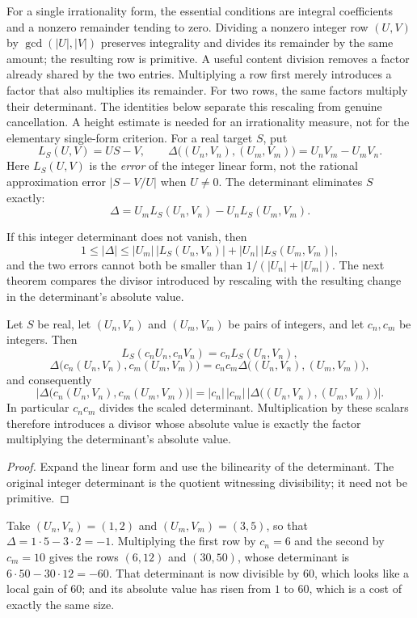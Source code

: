 For a single irrationality form, the essential conditions are
integral coefficients and a nonzero remainder tending to zero.
Dividing a nonzero integer row $(U,V)$ by $\gcd(|U|,|V|)$
preserves integrality and divides its remainder by the same amount;
the resulting row is primitive. A useful content division removes a factor already shared by the
two entries. Multiplying a row first merely introduces a factor
that also multiplies its remainder. For two rows, the same factors
multiply their determinant. The identities below separate this
rescaling from genuine cancellation. A height estimate is needed
for an irrationality measure, not for the elementary single-form
criterion. For a real target $S$, put
\[
 L_S(U,V)=US-V,
 \qquad
 \Delta\bigl((U_n,V_n),(U_m,V_m)\bigr)=U_nV_m-U_mV_n.
\]
Here \(L_S(U,V)\) is the \emph{error} of the integer linear form,
not the rational approximation error $|S-V/U|$ when $U\ne0$.
The determinant eliminates \(S\) exactly:
\[
\Delta=U_mL_S(U_n,V_n)-U_nL_S(U_m,V_m).
\]

If this integer determinant does not vanish, then
\[
 1\le|\Delta|
  \le|U_m|\,\bigl|L_S(U_n,V_n)\bigr|+|U_n|\,\bigl|L_S(U_m,V_m)\bigr|,
\]
and the two errors cannot both be smaller than
\(1/(|U_n|+|U_m|)\).  The next theorem compares the divisor introduced by rescaling with
the resulting change in the determinant's absolute value.

\begin{theorem}\label{long1049:res:content}
Let \(S\) be real, let \((U_n,V_n)\) and \((U_m,V_m)\) be pairs of integers, and
let \(c_n,c_m\) be integers.  Then
\[
 L_S(c_nU_n,c_nV_n)=c_nL_S(U_n,V_n),
\]
\[
 \Delta\bigl(c_n(U_n,V_n),c_m(U_m,V_m)\bigr)
 =c_nc_m\Delta\bigl((U_n,V_n),(U_m,V_m)\bigr),
\]
and consequently
\[
 \left|\Delta\bigl(c_n(U_n,V_n),c_m(U_m,V_m)\bigr)\right|
 =|c_n|\,|c_m|\,
   \left|\Delta\bigl((U_n,V_n),(U_m,V_m)\bigr)\right|.
\]
In particular \(c_nc_m\) divides the scaled determinant. Multiplication
by these scalars therefore introduces a divisor whose absolute value is
exactly the factor multiplying the determinant's absolute value.
\end{theorem}

\begin{proof}
Expand the linear form and use the bilinearity of the determinant.
The original integer determinant is the quotient witnessing divisibility;
it need not be primitive.
\end{proof}

\begin{example}\label{long1049:ex:content}
Take \((U_n,V_n)=(1,2)\) and \((U_m,V_m)=(3,5)\), so that
\(\Delta=1\cdot5-3\cdot2=-1\).  Multiplying the first row by \(c_n=6\) and the
second by \(c_m=10\) gives the rows \((6,12)\) and \((30,50)\), whose
determinant is \(6\cdot50-30\cdot12=-60\).  That determinant is now divisible
by \(60\), which looks like a local gain of \(60\); and its absolute value has
risen from \(1\) to \(60\), which is a cost of exactly the same size.
\end{example}

